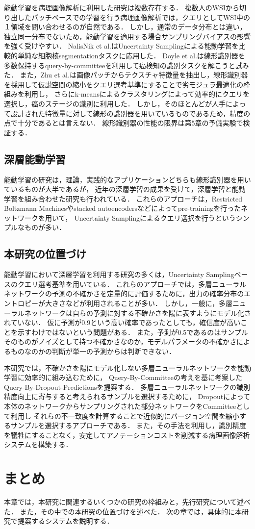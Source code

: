 能動学習を病理画像解析に利用した研究は複数存在する．
複数人のWSIから切り出したパッチベースでの学習を行う病理画像解析では，クエリとしてWSI中の１領域を問い合わせるのが自然である．
しかし，通常のデータ分布とは違い，独立同一分布でないため，能動学習を適用する場合サンプリングバイアスの影響を強く受けやすい．
NalisNik et al.はUncertainty Samplingによる能動学習を比較的単純な細胞核segmentationタスクに応用した\cite{nalisnik2017interactive}．
Doyle et al.は線形識別器を多数保持するquery-by-committeeを利用して癌検知の識別タスクを解こうと試みた\cite{doyle2011active}．
また，Zhu et al.は画像パッチからテクスチャ特徴量を抽出し，線形識別器を採用して仮説空間の縮小をクエリ選考基準にすることで劣モジュラ最適化の枠組みを利用し，
さらにk-meansによるクラスタリングによって効率的にクエリを選択し，癌のステージの識別に利用した\cite{zhu2014scalable}．
しかし，そのほとんどが人手によって設計された特徴量に対して線形の識別器を用いているものであるため，精度の点で十分であるとは言えない．
線形識別器の性能の限界は第5章の予備実験で検証する．

\subsection{深層能動学習}
能動学習の研究は，理論，実践的なアプリケーションどちらも線形識別器を用いているものが大半であるが，
近年の深層学習の成果を受けて，深層学習と能動学習を組み合わせた研究も行われている\cite{6889457, li2016active}．
これらのアプローチは，Restricted Boltzmann Machinesやstacked autoencodersなどによってpre-trainingを行ったネットワークを用いて，
Uncertainty Samplingによるクエリ選択を行うというシンプルなものが多い．


\subsection{本研究の位置づけ}
能動学習において深層学習を利用する研究の多くは，Uncertainty Samplingベースのクエリ選考基準を用いている．
これらのアプローチでは，多層ニューラルネットワークの予測の不確かさを定量的に評価するために，出力の確率分布のエントロピーが大きさなどが利用されることが多い．
しかし，一般に，多層ニューラルネットワークは自らの予測に対する不確かさを陽に表すようにモデル化されていない．
仮に予測が0.9という高い確率であったとしても，確信度が高いことを示すわけではないという問題がある．
また，予測が0.5であるのはサンプルそのものがノイズとして持つ不確かさなのか，モデルパラメータの不確かさによるものなのかの判断が単一の予測からは判断できない．

本研究では，不確かさを陽にモデル化しない多層ニューラルネットワークを能動学習に効率的に組み込むために，
Query-By-Committeeの考えを基に考案したQuery-By-Dropout-Predictionsを提案する．
多層ニューラルネットワークの識別精度向上に寄与すると考えられるサンプルを選択するために，
Dropoutによって本体のネットワークからサンプリングされた部分ネットワークをCommitteeとして利用し
それらの不一致度を計算することで近似的にバージョン空間を縮小するサンプルを選択するアプローチである．
また，その手法を利用し，識別精度を犠牲にすることなく，安定してアノテーションコストを削減する病理画像解析システムを構築する．

\section{まとめ}
本章では，本研究に関連するいくつかの研究の枠組みと，先行研究について述べた．
また，その中での本研究の位置づけを述べた．
次の章では，具体的に本研究で提案するシステムを説明する．
